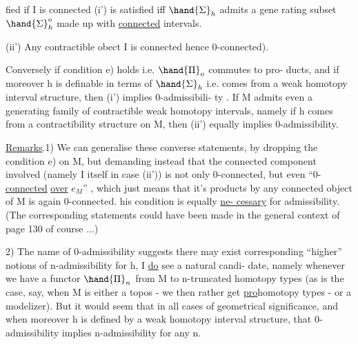 fied if I is connected\hand{,}  (i') is satisfied iff $\hand{\Sigma}_h$ admits a gene
rating subset $\hand{\Sigma}_h^o$ made up with \uline{connected} intervals.

(ii') Any contractible obect I is connected \hand{(}hence 0-connected).

 Conversely if condition e) holds i.e. $\hand{\Pi}_o$ commutes to pro-
ducts,  and if moreover h is definable in terms of $\hand{\Sigma}_h$ i.e. comes
from a weak homotopy interval structure, then (i') implies 0-admissibili-
ty . If M admits even a generating family of contractible weak homotopy
intervals, namely if h comes from a contractibility structure on M, then
(ii') equally implies  0-admissibility.

\uline{Remarks}.1) We can generalise these converse statements, by dropping the
condition e) on M, but demanding instead that the connected component
involved (namely I itself in case (ii')) is not only 0-connected, but
even ``0-\uline{connected} \uline{over} $e_M$'' , which just means that it's products by any
connected object of M is again 0-connected.  his condition is equally \uline{ne-%
cessary} for admissibility. (The corresponding statements could have been
made in the general context of page 130 of course ...)

2) The name of 0-admissibility suggests there may exist corresponding
``higher'' notions of n-admissibility for h,  I \uline{do} see  a natural candi-%
date, namely whenever we have a functor  $\hand{\Pi}_n$ from M to n-truncated
homotopy types (as is the case, say, when M is either a topos - we
then rather get \uline{pro}homotopy types - or a modelizer). But it would seem
that in all cases of geometrical significance, and when moreover h is
defined by a weak homotopy interval structure, that 0-admissibility
implies  n-admissibility for any n.


